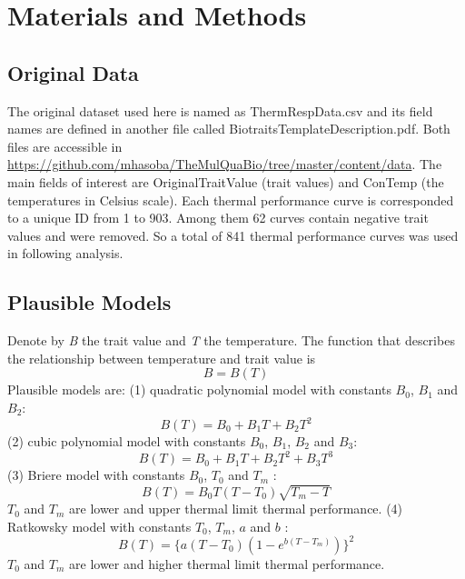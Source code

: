 \documentclass[11pt]{article}
\begin{document}
  \section{Materials and Methods}
    \subsection{Original Data}
    The original dataset used here is named as ThermRespData.csv and its field names are defined in another 
    file called BiotraitsTemplateDescription.pdf. Both files are accessible in 
    \newline 
    \href{https://github.com/mhasoba/TheMulQuaBio/tree/master/content/data}{https://github.com/mhasoba/TheMulQuaBio/tree/master/content/data}. 
    \newline 
    The main fields of interest are OriginalTraitValue (trait values) and ConTemp (the temperatures 
    in Celsius scale). Each thermal performance curve is corresponded to a unique ID from 1 to 903. 
    Among them 62 curves contain negative trait values and were removed. 
    So a total of 841 thermal performance curves was used in following analysis. 
    
  \subsection{Plausible Models} 
    Denote by \textit{B} the trait value and \textit{T} the temperature. The function that describes 
    the relationship between temperature and trait value is  
    \begin{equation} 
      B = B(T) 
    \end{equation} 
    Plausible models are: (1) quadratic polynomial model with constants  
    $B_0$, $B_1$ and $B_2$: 
    \begin{equation} 
    B(T) = B_0 + B_1 T + B_2 T^2 
    \end{equation} 
    (2) cubic polynomial model with constants  
    $B_0$, $B_1$, $B_2$ and $B_3$: 
    \begin{equation} 
    B(T) = B_0 + B_1 T + B_2 T^2 + B_3 T^3 
    \end{equation} 
    (3) Briere model with constants  
    $B_0$, $T_0$ and $T_m$ 
    \cite{briere1999novel}: 
    \begin{equation}\label{equ:Briere} 
    B(T) = B_0 T (T - T_0) \sqrt{T_m - T} 
    \end{equation} 
    $T_0$ and $T_m$ are lower and upper thermal limit thermal performance. 
    \newline 
    (4) Ratkowsky model with constants  
    $T_0$, $T_m$, $a$ and $b$  
    \cite{ratkowsky1983model}: 
    \begin{equation} 
    B(T) = \{a (T-T_0) (1-e^{b(T-T_m)})\}^2 
    \end{equation} 
    $T_0$ and $T_m$ are lower and higher thermal limit thermal performance. 
\end{document}
